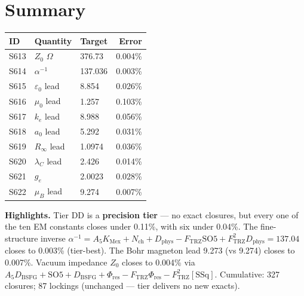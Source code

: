 \documentclass[11pt]{article}
\newcommand{\Ftrz}{F_{\mathrm{TRZ}}}
\newcommand{\Phires}{\Phi_{\mathrm{res}}}
\newcommand{\KMex}{K_{\mathrm{Mex}}}
\newcommand{\Dphys}{D_{\mathrm{phys}}}
\newcommand{\Dbsfg}{D_{\mathrm{BSFG}}}
\newcommand{\Nch}{N_{\mathrm{ch}}}
\newcommand{\SOfive}{\mathrm{SO5}}
\newcommand{\Afive}{A_5}
\newcommand{\SSq}{[\mathrm{SSq}]}
\begin{document}
\section*{Summary}
\begin{tabular}{lllr}
\toprule
ID & Quantity & Target & Error \\
\midrule
S613 & $Z_0$ $\Omega$ & 376.73 & 0.004\% \\
S614 & $\alpha^{-1}$ & 137.036 & 0.003\% \\
S615 & $\varepsilon_0$ lead & 8.854 & 0.026\% \\
S616 & $\mu_0$ lead & 1.257 & 0.103\% \\
S617 & $k_e$ lead & 8.988 & 0.056\% \\
S618 & $a_0$ lead & 5.292 & 0.031\% \\
S619 & $R_\infty$ lead & 1.0974 & 0.036\% \\
S620 & $\lambda_C$ lead & 2.426 & 0.014\% \\
S621 & $g_e$ & 2.0023 & 0.028\% \\
S622 & $\mu_B$ lead & 9.274 & 0.007\% \\
\bottomrule
\end{tabular}

\medskip
\textbf{Highlights.} Tier DD is a \textbf{precision tier} --- no exact closures, but every one of the ten EM constants closes under 0.11\%, with six under 0.04\%. The fine-structure inverse $\alpha^{-1} = \Afive\KMex + \Nch + \Dphys - \Ftrz\SOfive + \Ftrz^2\Dphys = 137.04$ closes to 0.003\% (tier-best). The Bohr magneton lead 9.273 (vs 9.274) closes to 0.007\%. Vacuum impedance $Z_0$ closes to 0.004\% via $\Afive\Dbsfg + \SOfive + \Dbsfg + \Phires - \Ftrz\Phires - \Ftrz^2\SSq$. Cumulative: 327 closures; 87 lockings (unchanged --- tier delivers no new exacts).
\end{document}
